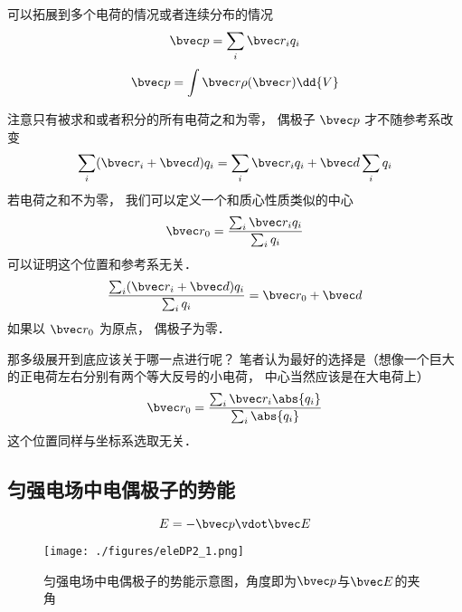 

可以拓展到多个电荷的情况或者连续分布的情况
\begin{equation}
\bvec p = \sum_i \bvec r_i q_i
\end{equation}
\begin{equation}
\bvec p = \int \bvec r \rho(\bvec r) \dd{V}
\end{equation}

注意只有被求和或者积分的所有电荷之和为零， 偶极子 $\bvec p$ 才不随参考系改变
\begin{equation}
\sum_i (\bvec r_i + \bvec d) q_i = \sum_i \bvec r_i q_i + \bvec d \sum_i q_i
\end{equation}
若电荷之和不为零， 我们可以定义一个和质心性质类似的中心
\begin{equation}
\bvec r_0 = \frac{\sum_i \bvec r_i q_i}{\sum_i q_i}
\end{equation}
可以证明这个位置和参考系无关．
\begin{equation}
\frac{\sum_i (\bvec r_i + \bvec d) q_i}{\sum_i q_i} = \bvec r_0 + \bvec d
\end{equation}
如果以 $\bvec r_0$ 为原点， 偶极子为零．

那多级展开到底应该关于哪一点进行呢？ 笔者认为最好的选择是（想像一个巨大的正电荷左右分别有两个等大反号的小电荷， 中心当然应该是在大电荷上）
\begin{equation}
\bvec r_0 = \frac{\sum_i \bvec r_i \abs{q_i}}{\sum_i \abs{q_i}}
\end{equation}
这个位置同样与坐标系选取无关．

\subsection{匀强电场中电偶极子的势能}
\begin{equation}\label{eleDP2_eq1}
E = -\bvec p \vdot \bvec E
\end{equation}
\begin{figure}[ht]
\centering
\texttt{[image: ./figures/eleDP2\_1.png]}
\caption{匀强电场中电偶极子的势能示意图，角度即为$\bvec p$与$\bvec E$的夹角} \label{eleDP2_fig1}
\end{figure}
